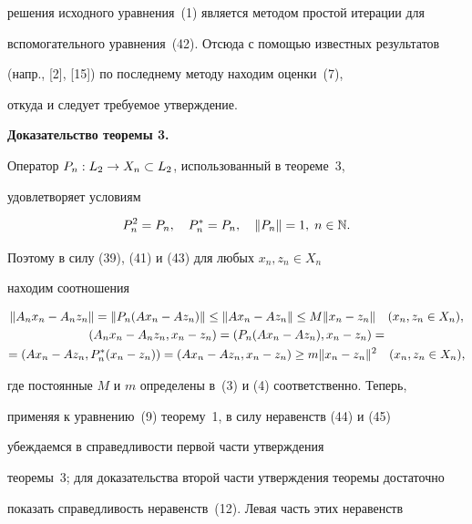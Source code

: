 решения исходного уравнения~(1) является методом простой итерации для


вспомогательного уравнения~(42). Отсюда с помощью известных результатов


(напр., [2], [15]) по последнему методу находим оценки~(7),


откуда и следует требуемое утверждение.


\medskip





{\bf Доказательство теоремы 3.}


Оператор $P_n : L_2 \to X_n\subset L_2$, использованный в теореме~3,


удовлетворяет условиям


\begin{equation}


P_n^2=P_n,\quad P_n^*=P_n,\quad \|P_n\|=1,\; n\in \Bbb N.


\end{equation}


Поэтому в силу (39), (41) и (43) для любых $x_n,z_n\in X_n$ 


находим соотношения


\begin{gather}


\|A_nx_n-A_nz_n\|=\|P_n(Ax_n-Az_n)\|\leq\|Ax_n-Az_n\|\leq


M \|x_n-z_n\|\quad (x_n,z_n\in X_n), \\


%


(A_nx_n-A_nz_n,x_n-z_n)=(P_n(Ax_n-Az_n),x_n-z_n)= \notag\\


%


=(Ax_n-Az_n,P_n^*(x_n-z_n))=(Ax_n-Az_n,x_n-z_n)\geq


m \|x_n-z_n\|^2\quad (x_n,z_n\in X_n),


\end{gather}


где постоянные $M$ и $m$ определены в~(3) и (4) соответственно. Теперь,


применяя к уравнению~(9) теорему~1, в силу неравенств (44) и (45)


убеждаемся в справедливости первой части утверждения


теоремы~3; для доказательства второй части утверждения теоремы достаточно


показать справедливость неравенств~(12). Левая часть этих неравенств


